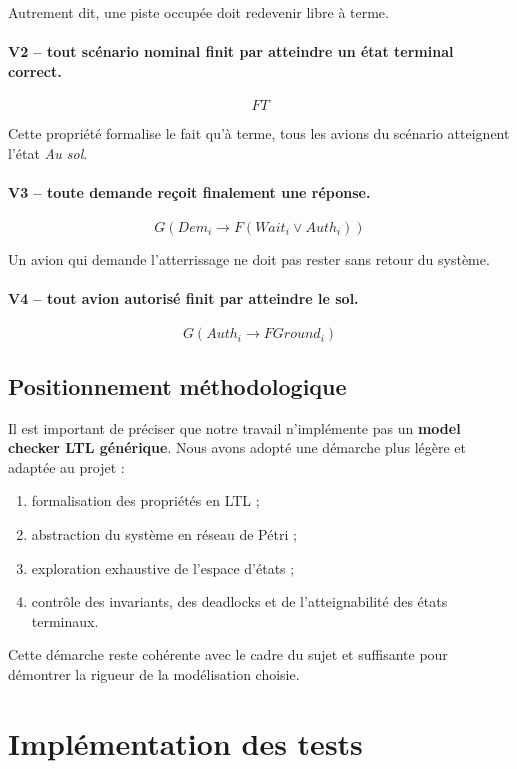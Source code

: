 \documentclass[11pt,a4paper]{article}
\begin{document}
Autrement dit, une piste occupée doit redevenir libre à terme.

\paragraph{V2 -- tout scénario nominal finit par atteindre un état terminal correct.}
\[
F T
\]

Cette propriété formalise le fait qu'à terme, tous les avions du scénario atteignent l'état \emph{Au sol}.

\paragraph{V3 -- toute demande reçoit finalement une réponse.}
\[
G(Dem_i \rightarrow F(Wait_i \lor Auth_i))
\]

Un avion qui demande l'atterrissage ne doit pas rester sans retour du système.

\paragraph{V4 -- tout avion autorisé finit par atteindre le sol.}
\[
G(Auth_i \rightarrow F Ground_i)
\]

\subsection{Positionnement méthodologique}

Il est important de préciser que notre travail n'implémente pas un \textbf{model checker LTL générique}. Nous avons adopté une démarche plus légère et adaptée au projet :
\begin{enumerate}
    \item formalisation des propriétés en LTL ;
    \item abstraction du système en réseau de Pétri ;
    \item exploration exhaustive de l'espace d'états ;
    \item contrôle des invariants, des deadlocks et de l'atteignabilité des états terminaux.
\end{enumerate}

Cette démarche reste cohérente avec le cadre du sujet et suffisante pour démontrer la rigueur de la modélisation choisie.

\section{Implémentation des tests}
\end{document}
